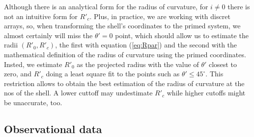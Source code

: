 Although there is an analytical form for the radius of curvature, for $i\ne 0$ there is not an intuitive form for  $R'_c$. Plus, in practice, we are working with discret arrays, so, when transforming the shell's coordinates to the primed system, we almost certainly will miss the $\theta'=0$ point, which
should allow us to estimate the radii $(R'_0,R'_c)$, the first with equation (\ref{eq:Rpar}) and the second with the mathematical definition of the radius of curvature using the primed coordinates. Insted, we estimate $R'_0$ as the projected radius with the value of $\theta'$ closest to zero, and
$R'_c$ doing a least square fit to the points such as $\theta' \leq 45^\circ$. This restriction allows to obtain the best estimation of the radius of curvature at the nos of the shell. A lower cuttoff may undestimate $R'_c$ while higher cutoffs might be unaccurate, too.


 
\subsection{Observational data}


